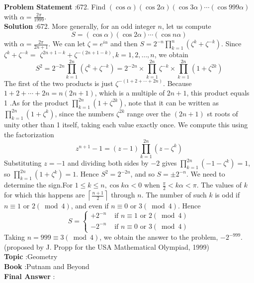 \documentclass[10pt]{article}
\begin{document}
\textbf{Problem Statement} :672. Find $(\cos \alpha)(\cos 2 \alpha)(\cos 3 \alpha) \cdots(\cos 999 \alpha)$ with $\alpha=\frac{2 \pi}{1999}$. \\
\textbf{Solution} :672. More generally, for an odd integer $n$, let us compute$$ S=(\cos \alpha)(\cos 2 \alpha) \cdots(\cos n \alpha) $$with $\alpha=\frac{2 \pi}{2 n+1}$. We can let $\zeta=e^{i \alpha}$ and then $S=2^{-n} \prod_{k=1}^{n}\left(\zeta^{k}+\zeta^{-k}\right)$. Since $\zeta^{k}+\zeta^{-k}=$ $\zeta^{2 n+1-k}+\zeta^{-(2 n+1-k)}, k=1,2, \ldots, n$, we obtain $$ S^{2}=2^{-2 n} \prod_{k=1}^{2 n}\left(\zeta^{k}+\zeta^{-k}\right)=2^{-2 n} \times \prod_{k=1}^{2 n} \zeta^{-k} \times \prod_{k=1}^{2 n}\left(1+\zeta^{2 k}\right) $$The first of the two products is just $\zeta^{-(1+2+\cdots+2 n)}$. Because $1+2+\cdots+2 n=n(2 n+1)$, which is a multiple of $2 n+1$, this product equals 1 .As for the product $\prod_{k=1}^{2 n}\left(1+\zeta^{2 k}\right)$, note that it can be written as $\prod_{k=1}^{2 n}\left(1+\zeta^{k}\right)$, since the numbers $\zeta^{2 k}$ range over the $(2 n+1)$ st roots of unity other than 1 itself, taking each value exactly once. We compute this using the factorization$$ z^{n+1}-1=(z-1) \prod_{k=1}^{2 n}\left(z-\zeta^{k}\right) $$Substituting $z=-1$ and dividing both sides by $-2$ gives $\prod_{k=1}^{2 n}\left(-1-\zeta^{k}\right)=1$, so $\prod_{k=1}^{2 n}\left(1+\zeta^{k}\right)=1$. Hence $S^{2}=2^{-2 n}$, and so $S=\pm 2^{-n}$. We need to determine the sign.For $1 \leq k \leq n, \cos k \alpha<0$ when $\frac{\pi}{2}<k \alpha<\pi$. The values of $k$ for which this happens are $\left\lceil\frac{n+1}{2}\right\rceil$ through $n$. The number of such $k$ is odd if $n \equiv 1$ or $2(\bmod 4)$, and even if $n \equiv 0$ or $3(\bmod 4)$. Hence$$ S= \begin{cases}+2^{-n} & \text { if } n \equiv 1 \text { or } 2(\bmod 4) \\ -2^{-n} & \text { if } n \equiv 0 \text { or } 3(\bmod 4)\end{cases} $$Taking $n=999 \equiv 3(\bmod 4)$, we obtain the answer to the problem, $-2^{-999}$.(proposed by J. Propp for the USA Mathematical Olympiad, 1999)\\
\textbf{Topic} :Geometry\\
\textbf{Book} :Putnam and Beyond\\
\textbf{Final Answer} :\\
\end{document}
